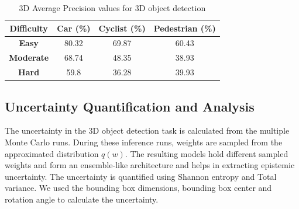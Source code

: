 \documentclass[10pt,twocolumn,letterpaper]{article}
\begin{document}
\begin{table}[!htbp]
    \centering
    \begin{tabular}{|c|c|c|c|}
        \hline \textbf{Difficulty} & \textbf{Car (\%)} & \textbf{Cyclist (\%)} & \textbf{Pedestrian (\%)}  \\
        \hline \textbf{Easy} & 80.32  & 69.87  & 60.43 \\
        \hline \textbf{Moderate} & 68.74  & 48.35 & 38.93 \\
        \hline \textbf{Hard} & 59.8  & 36.28  & 39.93  \\
        \hline
    \end{tabular}
	\caption[3D AP calculated for 2D proposals generated from 3D Annotations]{3D Average Precision values for 3D object detection }
	\label{3DAP_Values-2}
    \end{table}
\subsection{Uncertainty Quantification and Analysis}
The uncertainty in the 3D object detection task is calculated from the multiple Monte Carlo runs. During these inference runs, weights are sampled from the approximated distribution $q(w)$. The resulting models hold different sampled weights and form an ensemble-like architecture and helps in extracting epistemic uncertainty. The uncertainty is quantified using Shannon entropy and Total variance. We used the bounding box dimensions, bounding box center and rotation angle to calculate the uncertainty.
\end{document}
